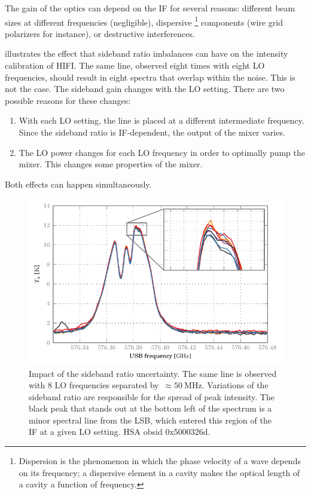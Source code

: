 The gain of the optics can depend on the IF for several reasons:
different beam sizes at different frequencies (negligible), dispersive%
\footnote{
    Dispersion is the phenomenon in which the phase velocity of a wave depends on its frequency; a dispersive element in a cavity makes the optical length of a cavity a function of frequency.
}
components (wire grid polarizers for instance), or destructive interferences.

 illustrates the effect that sideband ratio imbalances can have on the intensity calibration of HIFI.
The same line, observed eight times with eight LO frequencies, should result in eight spectra that overlap within the noise.
This is not the case.
The sideband gain changes with the LO setting.
There are two possible reasons for these changes:
\begin{enumerate}
    \item With each LO setting, the line is placed at a different intermediate frequency.  Since the sideband ratio is IF-dependent, the output of the mixer varies.
    \item The LO power changes for each LO frequency in order to optimally pump the mixer.
    This changes some properties of the mixer.
\end{enumerate}
Both effects can happen simultaneously.

\begin{figure}
    \centering
    \includegraphics{sbr_effect}
    \caption{
        Impact of the sideband ratio uncertainty.
        The same line is observed with 8 LO frequencies separated by~$\approx \SI{50}{\mega\hertz}$.
        Variations of the sideband ratio are responsible for the spread of peak intensity.
        The black peak that stands out at the bottom left of the spectrum is a minor spectral line from the LSB, which entered this region of the IF at a given LO setting.
        HSA obsid 0x5000326d.
    }
    \label{fig:sbr_effect}
\end{figure}

